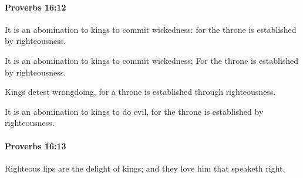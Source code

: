 		\paragraph{Proverbs 16:12} %
			\label{PROVERBS-16-12}

			It is an abomination to kings to commit wickedness: for the throne is established by righteousness.

			\begin{versebox}
					\item[BHS] 
					\item[ASV] It is an abomination to kings to commit wickedness; For the throne is established by righteousness.
					\item[NIV] Kings detest wrongdoing, for a throne is established through righteousness.
					\item[NRSV] It is an abomination to kings to do evil, for the throne is established by righteousness.
			\end{versebox}

		\paragraph{Proverbs 16:13} %
			\label{PROVERBS-16-13}

			Righteous lips are the delight of kings; and they love him that speaketh right.

